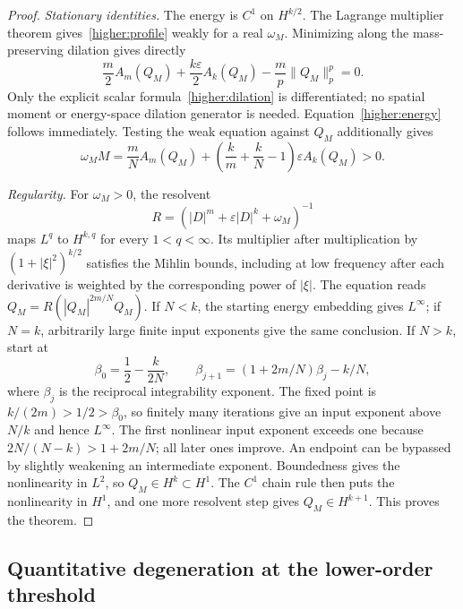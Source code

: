 \begin{proof}
\emph{Stationary identities.}
The energy is $C^1$ on $H^{k/2}$. The Lagrange multiplier theorem
gives~\eqref{higher:profile} weakly for a real $\omega_M$.
Minimizing along the mass-preserving dilation gives directly
\begin{equation}\label{higher:pohozaev}
 \frac m2A_m(Q_M)+\frac{k\varepsilon}2A_k(Q_M)
                         -\frac mp\|Q_M\|_p^p=0.
\end{equation}
Only the explicit scalar formula~\eqref{higher:dilation} is
differentiated; no spatial moment or energy-space dilation generator
is needed. Equation~\eqref{higher:energy} follows immediately.
Testing the weak equation against $Q_M$ additionally gives
\begin{equation}\label{higher:frequency}
 \omega_M M=\frac mN A_m(Q_M)
   +\left(\frac{k}{m}+\frac{k}{N}-1\right)
           \varepsilon A_k(Q_M)>0.
\end{equation}

\emph{Regularity.}
For $\omega_M>0$, the resolvent
\[
 R=(|D|^m+\varepsilon|D|^k+\omega_M)^{-1}
\]
maps $L^q$ to $H^{k,q}$ for every $1<q<\infty$. Its multiplier
after multiplication by $(1+|\xi|^2)^{k/2}$ satisfies the Mihlin
bounds, including at low frequency after each derivative is weighted
by the corresponding power of $|\xi|$. The equation reads
$Q_M=R(|Q_M|^{2m/N}Q_M)$.
If $N<k$, the starting energy embedding gives $L^\infty$; if $N=k$,
arbitrarily large finite input exponents give the same conclusion.
If $N>k$, start at
\[
 \beta_0=\frac12-\frac{k}{2N},\qquad
 \beta_{j+1}=(1+2m/N)\beta_j-k/N,
\]
where $\beta_j$ is the reciprocal integrability exponent. The fixed
point is $k/(2m)>1/2>\beta_0$, so finitely many iterations give an
input exponent above $N/k$ and hence $L^\infty$. The first nonlinear
input exponent exceeds one because $2N/(N-k)>1+2m/N$; all later
ones improve. An endpoint can be bypassed by slightly weakening an
intermediate exponent. Boundedness gives the nonlinearity in $L^2$,
so $Q_M\in H^k\subset H^1$. The $C^1$ chain rule then puts the
nonlinearity in $H^1$, and one more resolvent step gives
$Q_M\in H^{k+1}$. This proves the theorem.
\end{proof}

\subsection{Quantitative degeneration at the lower-order threshold}

